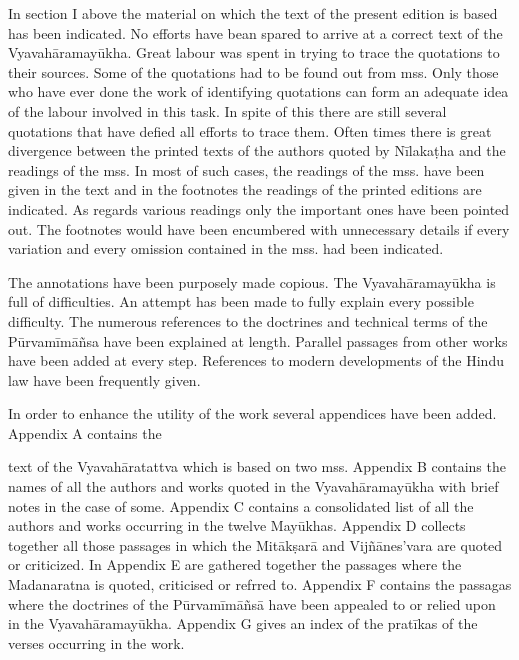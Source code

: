 \documentclass[11pt, openany]{book}
\begin{document}
In section I above the material on which the text of the present edition is based has been indicated. No efforts have bean spared to arrive at a correct text of the Vyavahāramayūkha. Great labour was spent in trying to trace the quotations to their sources. Some of the quotations had to be found out from mss. Only those who have ever done the work of identifying quotations can form an adequate idea of the labour involved in this task. In spite of this there are still several quotations that have defied all efforts to trace them. Often times there is great divergence between the printed texts of the authors quoted by Nīlakaṭha and the readings of the mss. In most of such cases, the readings of the mss. have been given in the text and in the footnotes the readings of the printed editions are indicated. As regards various readings only the important ones have been pointed out. The footnotes would have been encumbered with unnecessary details if every variation and every omission contained in the mss. had been indicated.

The annotations have been purposely made copious. The Vyavahāramayūkha is full of difficulties. An attempt has been made to fully explain every possible difficulty. The numerous references to the doctrines and technical terms of the Pūrvamīmāñsa have been explained at length. Parallel passages from other works have been added at every step. References to modern developments of the Hindu law have been frequently given.

In order to enhance the utility of the work several appendices have been added. Appendix A contains the

\fancyhead[RE,LO]{\thepage}
\cfoot{}
\newpage
\renewcommand{\thepage}{\Roman{page}}
\setcounter{page}{47}


\noindent
text of the Vyavahāratattva which is based on two mss. Appendix B contains the names of all the authors and works quoted in the Vyavahāramayūkha with brief notes in the case of some. Appendix C contains a consolidated list of all the authors and works occurring in the twelve Mayūkhas. Appendix D collects together all those passages in which the Mitākṣarā and Vijñānes'vara are quoted or criticized. In Appendix E are gathered together the passages where the Madanaratna is quoted, criticised or refrred to. Appendix F contains the passagas where the doctrines of the Pūrvamīmāñsā have been appealed to or relied upon in the Vyavahāramayūkha. Appendix G gives an index of the pratīkas of the verses occurring in the work.
\end{document}
